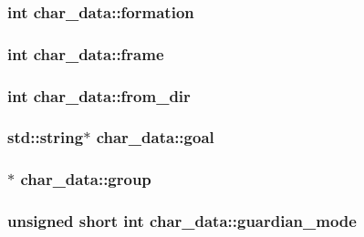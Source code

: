 \hypertarget{structchar__data_ab5831dabd736ba9be7a6ef131004cdba}{
\subsubsection[{formation}]{\setlength{\rightskip}{0pt plus 5cm}int char\-\_\-data\-::formation}}\label{structchar__data_ab5831dabd736ba9be7a6ef131004cdba}
\hypertarget{structchar__data_a09f8da916a21777fad1b3e4483d3b8f1}{
\subsubsection[{frame}]{\setlength{\rightskip}{0pt plus 5cm}int char\-\_\-data\-::frame}}\label{structchar__data_a09f8da916a21777fad1b3e4483d3b8f1}
\hypertarget{structchar__data_a01dd4395da357ea7f8643bd3c89176b9}{
\subsubsection[{from\-\_\-dir}]{\setlength{\rightskip}{0pt plus 5cm}int char\-\_\-data\-::from\-\_\-dir}}\label{structchar__data_a01dd4395da357ea7f8643bd3c89176b9}
\hypertarget{structchar__data_ac4261577d4f621e927d0ec1243c1253f}{
\subsubsection[{goal}]{\setlength{\rightskip}{0pt plus 5cm}std\-::string$\ast$ char\-\_\-data\-::goal}}\label{structchar__data_ac4261577d4f621e927d0ec1243c1253f}
\hypertarget{structchar__data_a4456209f640df5a6487031c9d3849844}{
\subsubsection[{group}]{$\ast$ char\-\_\-data\-::group}}\label{structchar__data_a4456209f640df5a6487031c9d3849844}
\hypertarget{structchar__data_acc927dff260524dfe2d1c3aa03d50bbe}{
\subsubsection[{guardian\-\_\-mode}]{\setlength{\rightskip}{0pt plus 5cm}unsigned short int char\-\_\-data\-::guardian\-\_\-mode}}\label{structchar__data_acc927dff260524dfe2d1c3aa03d50bbe}
